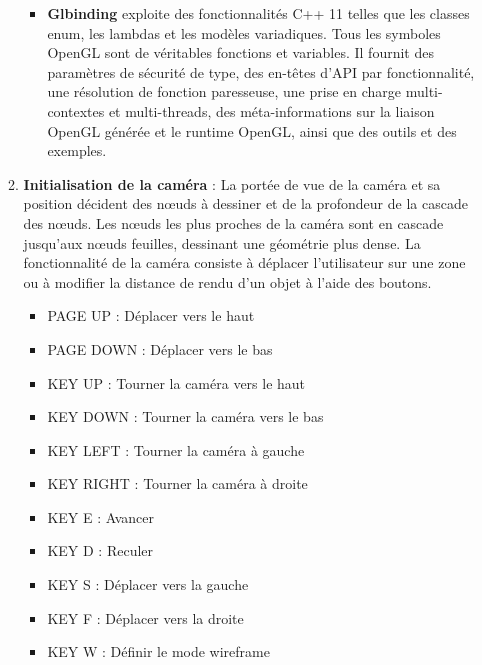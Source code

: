 \documentclass[12pt]{report}
\begin{document}
\begin{enumerate}
\begin{enumerate}
\begin{itemize}
            \item \textbf{Glbinding} exploite des fonctionnalités C++ 11 telles que les classes enum, les lambdas et les modèles variadiques. Tous les symboles OpenGL sont de véritables fonctions et variables. Il fournit des paramètres de sécurité de type, des en-têtes d'API par fonctionnalité, une résolution de fonction paresseuse, une prise en charge multi-contextes et multi-threads, des méta-informations sur la liaison OpenGL générée et le runtime OpenGL, ainsi que des outils et des exemples.
        \end{itemize}
        \item \textbf{Initialisation de la caméra} : 
        La portée de vue de la caméra et sa position décident des nœuds à dessiner et de la profondeur de la cascade des nœuds. Les nœuds les plus proches de la caméra sont en cascade jusqu'aux nœuds feuilles, dessinant une géométrie plus dense. La fonctionnalité de la caméra consiste à déplacer l'utilisateur sur une zone ou à modifier la distance de rendu d'un objet à l'aide des boutons. 
        \begin{itemize}
            \item PAGE UP : Déplacer vers le haut
            \item PAGE DOWN : Déplacer vers le bas
            \item KEY UP : Tourner la caméra vers le haut
            \item KEY DOWN : Tourner la caméra vers le bas
            \item KEY LEFT : Tourner la caméra à gauche
            \item KEY RIGHT : Tourner la caméra à droite
            \item KEY E : Avancer
            \item KEY D : Reculer
            \item KEY S : Déplacer vers la gauche
            \item KEY F : Déplacer vers la droite
            \item KEY W : Définir le mode wireframe
        \end{itemize}
        

\end{enumerate}
\end{enumerate}
\end{document}
